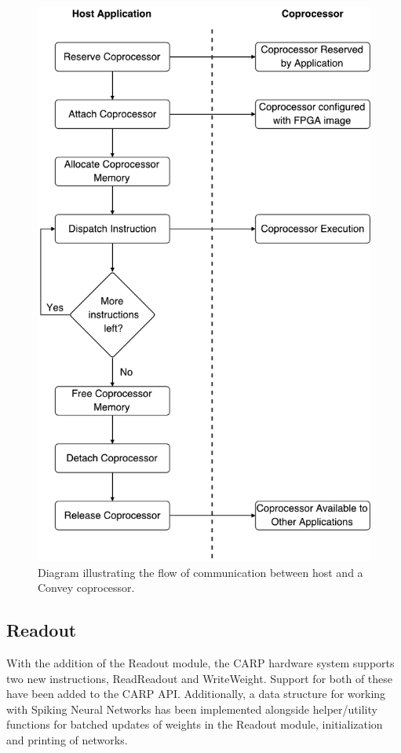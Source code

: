 \begin{figure}[ht]
  \centering
  \includegraphics[width=0.8\linewidth]{fig/convey-comm-flow}
  \caption[Host-Coprocessor communication flow]{
    Diagram illustrating the flow of communication between host and a Convey
    coprocessor.
  }
  \label{fig:convey-comm-flow}
\end{figure}

\subsection{Readout}

With the addition of the Readout module, the CARP hardware system supports two
new instructions, ReadReadout and WriteWeight. Support for both of these have
been added to the CARP API. Additionally, a data structure for working
with Spiking Neural Networks has been implemented alongside helper/utility
functions for batched updates of weights in the Readout module, initialization
and printing of networks.

\cleardoublepage
